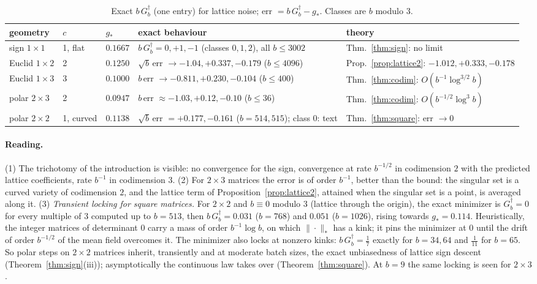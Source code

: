 \documentclass[10pt]{article}
\theoremstyle{definition}
\theoremstyle{remark}
\newcommand{\nnuc}[1]{\|#1\|_{*}}
\newcommand{\st}{\dagger}
\begin{document}
\begin{table}[h]\centering\footnotesize
\caption{Exact $b\,G_b^\st$ (one entry) for lattice noise; err $=b\,G_b^\st-g_\ast$. Classes are $b$ modulo $3$.}\label{tab:exact}
\begin{tabular}{@{}lllll@{}}
\toprule
geometry & $c$ & $g_\ast$ & exact behaviour & theory\\
\midrule
sign $1\times1$ & 1, flat & $0.1667$ & $b\,G^\st_b=0,+1,-1$ (classes $0,1,2$), all $b\le3002$ & Thm.~\ref{thm:sign}: no limit\\
Euclid $1\times2$ & 2 & $0.1250$ & $\sqrt b\,$err $\to-1.04,+0.337,-0.179$ ($b\le4096$) & Prop.~\ref{prop:lattice2}: $-1.012,+0.333,-0.178$\\
Euclid $1\times3$ & 3 & $0.1000$ & $b\,$err $\to-0.811,+0.230,-0.104$ ($b\le400$) & Thm.~\ref{thm:codim}: $O(b^{-1}\log^{3/2}b)$\\
polar $2\times3$ & 2 & $0.0947$ & $b\,$err $\approx-1.03,+0.12,-0.10$ ($b\le36$) & Thm.~\ref{thm:codim}: $O(b^{-1/2}\log^3b)$\\
polar $2\times2$ & 1, curved & $0.1138$ & $\sqrt b\,$err $=+0.177,-0.161$ ($b=514,515$); class $0$: text & Thm.~\ref{thm:square}: err $\to0$\\
\bottomrule
\end{tabular}
\end{table}

\paragraph{Reading.} (1) The trichotomy of the introduction is visible: no convergence for the sign, convergence at
rate $b^{-1/2}$ in codimension $2$ with the predicted lattice coefficients, rate $b^{-1}$ in codimension $3$. (2) For
$2\times3$ matrices the error is of order $b^{-1}$, better than the bound: the singular set is a curved variety of
codimension $2$, and the lattice term of Proposition~\ref{prop:lattice2}, attained when the singular set is a point,
is averaged along it. (3) \emph{Transient locking for square matrices.} For $2\times2$ and $b\equiv0$ modulo $3$ (lattice
through the origin), the exact minimizer is $G^\st_b=0$ for every multiple of $3$ computed up to $b=513$, then
$b\,G_b^\st=0.031$ ($b=768$) and $0.051$ ($b=1026$), rising towards $g_\ast=0.114$. Heuristically, the integer matrices of determinant
$0$ carry a mass of order $b^{-1}\log b$, on which $\nnuc\cdot$ has a kink; it pins the minimizer at $0$ until the drift
of order $b^{-1/2}$ of the mean field overcomes it. The minimizer also locks at nonzero kinks: $b\,G_b^\st=\frac17$ exactly for $b=34,64$ and $\frac1{11}$ for $b=65$. So polar steps on $2\times2$ matrices inherit, transiently and at
moderate batch sizes, the exact unbiasedness of lattice sign descent (Theorem~\ref{thm:sign}(iii)); asymptotically the
continuous law takes over (Theorem~\ref{thm:square}). At $b=9$ the same locking is seen for $2\times3$.
\end{document}
